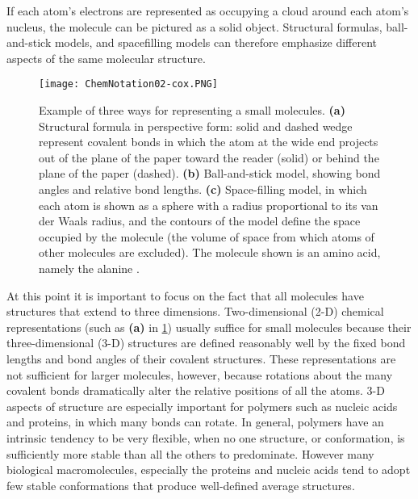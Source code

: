 If each atom's electrons are represented as occupying a cloud around each atom's nucleus, the molecule can be pictured as a solid object. Structural formulas, ball-and-stick models, and spacefilling models can therefore emphasize different aspects of the same molecular structure.
\cite{voet2016fundamentals}

\begin{figure}[h]
\centering
\begin{minipage}[t]{0.8\textwidth}
\centering
\texttt{[image: ChemNotation02-cox.PNG]}

\caption{\small{Example of three ways for representing a small molecules. \textbf{(a)} Structural formula in perspective form: solid and dashed wedge represent covalent bonds in which the atom at the wide end projects out of the plane of the paper toward the reader (solid) or behind the plane of the paper (dashed). \textbf{(b)} Ball-and-stick model, showing bond angles and relative bond lengths. \textbf{(c)} Space-filling model, in which each atom is shown as a sphere with a radius proportional to its van der Waals radius, and the contours of the model define the space occupied by the molecule (the volume of space from which atoms of other molecules are excluded). 
The molecule shown is an amino acid, namely the alanine
\cite{nelson2008lehninger}.}}

\label{fig:ChemNot}
\end{minipage} 
\end{figure}

At this point it is important to focus on the fact that all molecules have structures that extend to three dimensions.  Two-dimensional (2-D) chemical representations (such as \textbf{(a)} in \ref{fig:ChemNot}) usually suffice for small molecules because their three-dimensional (3-D) structures are defined reasonably well by the fixed bond lengths and bond angles of their covalent structures.
These representations are not sufficient for larger molecules, however, because rotations about the many covalent bonds dramatically alter the relative positions of all the atoms. 
3-D aspects of structure are especially important for polymers such as nucleic acids and proteins, in which many bonds can rotate. In general, polymers have an intrinsic tendency to be very flexible, when no one structure, or conformation, is sufficiently more stable than all the others to predominate. However many biological macromolecules, especially the proteins and nucleic acids tend to adopt few stable conformations that produce well-defined average structures.

